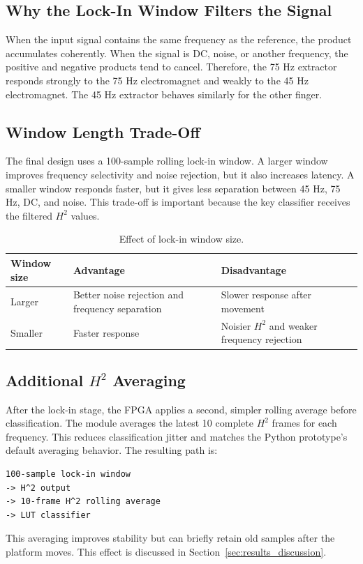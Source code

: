 \subsection{Why the Lock-In Window Filters the Signal}

When the input signal contains the same frequency as the reference, the product accumulates coherently. When the signal is DC, noise, or another frequency, the positive and negative products tend to cancel. Therefore, the 75 Hz extractor responds strongly to the 75 Hz electromagnet and weakly to the 45 Hz electromagnet. The 45 Hz extractor behaves similarly for the other finger.

\subsection{Window Length Trade-Off}

The final design uses a 100-sample rolling lock-in window. A larger window improves frequency selectivity and noise rejection, but it also increases latency. A smaller window responds faster, but it gives less separation between 45 Hz, 75 Hz, DC, and noise. This trade-off is important because the key classifier receives the filtered $H^2$ values.

\begin{table}[H]
    \centering
    \caption{Effect of lock-in window size.}
    \label{tab:window_tradeoff}
    \renewcommand{\arraystretch}{1.2}
    \begin{tabularx}{0.9\textwidth}{p{3.5cm} X X}
        \toprule
        \textbf{Window size} & \textbf{Advantage} & \textbf{Disadvantage} \\
        \midrule
        Larger & Better noise rejection and frequency separation & Slower response after movement \\
        Smaller & Faster response & Noisier $H^2$ and weaker frequency rejection \\
        \bottomrule
    \end{tabularx}
\end{table}

\subsection{Additional \texorpdfstring{$H^2$}{H2} Averaging}

After the lock-in stage, the FPGA applies a second, simpler rolling average before classification. The module  averages the latest 10 complete $H^2$ frames for each frequency. This reduces classification jitter and matches the Python prototype's default averaging behavior. The resulting path is:

\begin{lstlisting}
100-sample lock-in window
-> H^2 output
-> 10-frame H^2 rolling average
-> LUT classifier
\end{lstlisting}

This averaging improves stability but can briefly retain old samples after the platform moves. This effect is discussed in Section~\ref{sec:results_discussion}.
